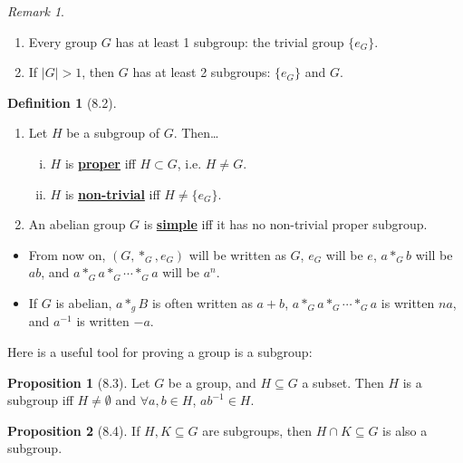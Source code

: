 \documentclass{article}
\newcommand{\es}{\emptyset}
\newcommand{\inter}{\cap}
\newcommand{\inverse}[1]{#1^{-1}}
\newcommand{\define}[1]{\textbf{\underline{#1}}}
\theoremstyle{definition}
\newtheorem*{defn}{Definition}
\newtheorem*{prop}{Proposition}
\theoremstyle{remark}
\newtheorem*{rmk}{Remark}
\begin{document}
{{            \begin{rmk}\hfill
                \begin{enumerate}
                    \item Every group $G$ has at least 1 subgroup: the trivial group $\{e_G\}$.
                    \item If $|G|>1$, then $G$ has at least 2 subgroups: $\{e_G\}$ and $G$.
                \end{enumerate}
            \end{rmk}
            
            \begin{defn}[8.2]\hfill
                \begin{enumerate}
                    \item Let $H$ be a subgroup of $G$. Then\ldots
                    \begin{enumerate}[i)]
                        \item $H$ is \define{proper} iff $H \subset G$, i.e. $H\neq G$.
                        \item $H$ is \define{non-trivial} iff $H \neq \{e_G\}$.
                    \end{enumerate}
                    \item An abelian group $G$ is \define{simple} iff it has no non-trivial proper subgroup.
                \end{enumerate}
            \end{defn}
        
            \begin{itemize}
                \item From now on, $(G, *_G,e_G)$ will be written as $G$, $e_G$ will be $e$, $a*_Gb$ will be $ab$, and $a*_Ga*_G\cdots *_Ga$ will be $a^n$.
                \item If $G$ is abelian, $a*_gB$ is often written as $a+b$, $a*_Ga*_G\cdots *_Ga$ is written $na$, and $\inverse{a}$ is written $-a$.
            \end{itemize}
            
            Here is a useful tool for proving a group is a subgroup:
            \begin{prop}[8.3]
                Let $G$ be a group, and $H\subseteq G$ a subset. Then $H$ is a subgroup iff $H \neq \es$ and $\forall a,b \in H$, $a\inverse{b} \in H$.
            \end{prop}
            
            \begin{prop}[8.4]
                If $H,K \subseteq G$ are subgroups, then $H \inter K \subseteq G$ is also a subgroup.
            \end{prop}
        }
    }
    
\end{document}

